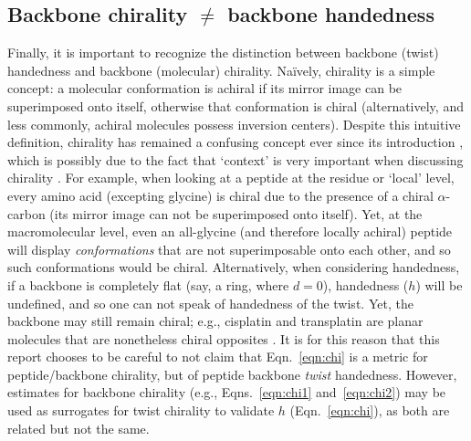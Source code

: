 \documentclass[fleqn,10pt,lineno]{wlpeerj} %
\newcommand{\n}[1]{{\color{black}#1}} %
\newcommand{\Eqn}[1]{Eqn.~\ref{#1}}
\newcommand{\Eqns}[1]{Eqns.~\ref{#1}}
\newcommand{\h}{h}
\begin{document}
\subsection*{\n{Backbone chirality $\bm\neq$ backbone handedness}}
\n{Finally, it is important to recognize the distinction between backbone (twist) handedness and backbone (molecular) chirality. Na{\"i}vely, chirality is a simple concept: a molecular conformation is achiral if its mirror image can be superimposed onto itself, otherwise that conformation is chiral \citep{Gold1997} (alternatively, and less commonly, achiral molecules possess inversion centers). Despite this intuitive definition, chirality has remained a confusing concept ever since its introduction \citep{Bentley2010,Wallentin2009}, which is possibly due to the fact that `context' is very important when discussing chirality \citep{Mislow2002}. For example, when looking at a peptide at the residue or `local' level, every amino acid (excepting glycine) is chiral due to the presence of a chiral $\alpha$-carbon (its mirror image can not be superimposed onto itself). Yet, at the macromolecular level, even an all-glycine (and therefore locally achiral) peptide will display {\em conformations} that are not superimposable onto each other, and so such conformations would be chiral. Alternatively, when considering handedness, if a backbone is completely flat (say, a ring, where $d=0$), handedness ($h$) will be undefined, and so one can not speak of handedness of the twist. Yet, the backbone may still remain chiral; e.g., cisplatin and transplatin are planar molecules that are nonetheless chiral opposites \citep{Testa2013}. It is for this reason that this report chooses to be careful to not claim that \Eqn{eqn:chi} is a metric for peptide/backbone chirality, but of peptide backbone {\em twist} handedness. However, estimates for backbone chirality (e.g., \Eqns{eqn:chi1} and~\ref{eqn:chi2}) may be used as surrogates for twist chirality to validate $\h$ (\Eqn{eqn:chi}), as both are related but not the same.}
\end{document}
